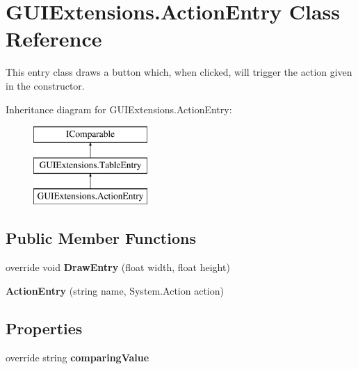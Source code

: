 \hypertarget{class_g_u_i_extensions_1_1_action_entry}{}\section{G\+U\+I\+Extensions.\+Action\+Entry Class Reference}
\label{class_g_u_i_extensions_1_1_action_entry}


This entry class draws a button which, when clicked, will trigger the action given in the constructor.  


Inheritance diagram for G\+U\+I\+Extensions.\+Action\+Entry\+:\begin{figure}[H]
\begin{center}
\leavevmode
\includegraphics[height=3.000000cm]{class_g_u_i_extensions_1_1_action_entry}
\end{center}
\end{figure}
\subsection*{Public Member Functions}
\begin{DoxyCompactItemize}
\item 
\mbox{\label{class_g_u_i_extensions_1_1_action_entry_a5718276960f5d27a0562e9327df64bbc}} 
override void {\bfseries Draw\+Entry} (float width, float height)
\item 
\mbox{\label{class_g_u_i_extensions_1_1_action_entry_adbb4bee6f9a29fa11978179fb6d24ff8}} 
{\bfseries Action\+Entry} (string name, System.\+Action action)
\end{DoxyCompactItemize}
\subsection*{Properties}
\begin{DoxyCompactItemize}
\item 
\mbox{\label{class_g_u_i_extensions_1_1_action_entry_ad2776be247baefb5c1ec443bd1244cfd}} 
override string {\bfseries comparing\+Value}
\end{DoxyCompactItemize}


